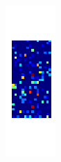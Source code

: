 \begin{frame}[plain]
\begin{figure}
\begin{subfigure}{0.2\textwidth}
\end{subfigure}
\begin{subfigure}{0.2\textwidth}
\includegraphics[width=\textwidth]{mlp_1_hidden}


\end{subfigure}
\end{figure}
\end{frame}
